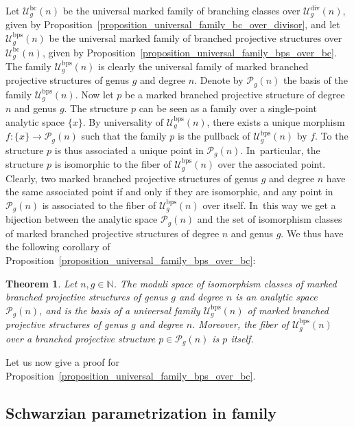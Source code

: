 \documentclass[10pt]{amsart}
\newcommand{\N}{\mathbb N}
\newcommand{\BC}{\mathrm{bc}}
\newcommand{\BPS}{\mathrm{bps}}
\DeclareMathOperator{\Div}{div}
\theoremstyle{definition}
\theoremstyle{plain}
\newtheorem{theorem}[definition]{Theorem}
\begin{document}
Let $\mathcal U_g^{\BC}(n)$ be the universal marked family of branching classes over $\mathcal U_g^{\Div}(n)$, given by Proposition~\ref{proposition_universal_family_bc_over_divisor}, and let $\mathcal U_g^{\BPS}(n)$ be the universal marked family of branched projective structures over $\mathcal U_g^{\BC}(n)$, given by Proposition~\ref{proposition_universal_family_bps_over_bc}.
The family $\mathcal U_g^{\BPS}(n)$ is clearly the universal family of marked branched projective structures of genus $g$ and degree $n$.
Denote by $\mathcal P_g(n)$ the basis of the family $\mathcal U_g^{\BPS}(n)$.
Now let $p$ be a marked branched projective structure of degree $n$ and genus $g$.
The structure $p$ can be seen as a family over a single-point analytic space $\{x\}$.
By universality of $\mathcal U_g^{\BPS}(n)$, there exists a unique morphism $f: \{x\} \to \mathcal P_g(n)$ such that the family $p$ is the pullback of $\mathcal U_g^{\BPS}(n)$ by $f$.
To the structure $p$ is thus associated a unique point in $\mathcal P_g(n)$. In~particular, the structure $p$ is isomorphic to the fiber of $\mathcal U_g^{\BPS}(n)$ over the associated point.
Clearly, two marked branched projective structures of genus $g$ and degree $n$ have the same associated point if and only if they are isomorphic, and any point in $\mathcal P_g(n)$ is associated to the fiber of $\mathcal U_g^{\BPS}(n)$ over itself. In~this way we get a bijection between the analytic space $\mathcal P_g(n)$ and the set of isomorphism classes of marked branched projective structures of degree $n$ and genus $g$.
We thus have the following corollary of Proposition~\ref{proposition_universal_family_bps_over_bc}:

\begin{theorem}\label{theorem_moduli_space_bps}
Let $n, g \in \N$. The moduli space of isomorphism classes of marked branched projective structures of genus $g$ and degree $n$ is an analytic space $\mathcal P_g(n)$, and is the basis of a universal family $\mathcal U_g^{\BPS}(n)$ of marked branched projective structures of genus $g$ and degree $n$.
Moreover, the fiber of $\mathcal U_g^{\BPS}(n)$ over a branched projective structure $p \in \mathcal P_g(n)$ is $p$ itself.
\end{theorem}

Let us now give a proof for Proposition~\ref{proposition_universal_family_bps_over_bc}.

\subsection{Schwarzian parametrization in family}\label{subsection_Schwarzian_parametrization_in_family}
\end{document}
